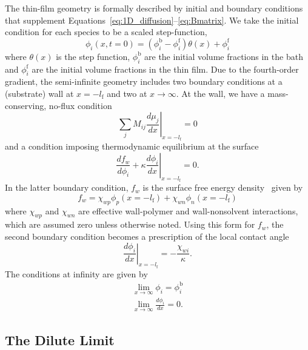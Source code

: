 \documentclass[journal=mamobx, layout=twocolumn]{achemso}
\newcommand{\txtf}{\mathrm{f}}
\newcommand{\txtb}{\mathrm{b}}
\begin{document}
The thin-film geometry is formally described by initial and boundary conditions that supplement Equations~\ref{eq:1D_diffusion}--\ref{eq:Bmatrix}.
We take the initial condition for each species to be a scaled step-function,
\begin{equation} \label{eq:ic}
\phi_{i}(x, t=0) = (\phi_{i}^{\txtb} - \phi_{i}^{\txtf}) \theta(x) + \phi_{i}^{\txtf}
\end{equation}
where $\theta(x)$ is the step function, $\phi_{i}^{\txtb}$ are the initial volume fractions in the bath and $\phi_{i}^{\txtf}$ are the initial volume fractions in the thin film.
Due to the fourth-order gradient, the semi-infinite geometry includes two boundary conditions at a (substrate) wall at $x = -l_{\txtf}$ and two at $x \rightarrow \infty$. 
At the wall, we have a mass-conserving, no-flux condition
\begin{equation}
\sum_{j} M_{ij} \left . \frac{d \mu_{j}}{d x} \right |_{x = -l_{\txtf}} = 0
\end{equation}
and a condition imposing thermodynamic equilibrium at the surface
\begin{equation}
\left . \frac{d f_{w}}{d \phi_{i}} + \kappa \frac{d \phi_{i}}{d x} \right |_{x=-l_{\txtf}} = 0 \textrm{.}
\end{equation}
In the latter boundary condition, $f_{w}$ is the surface free energy density~\cite{Schmidt1985,Hur2012} given by
\begin{equation}
f_w = \chi_{wp} \phi_{p}(x=-l_{\txtf}) + \chi_{wn} \phi_{n}(x=-l_{\txtf})
\end{equation}
where $\chi_{wp}$ and $\chi_{wn}$ are effective wall-polymer and wall-nonsolvent interactions, which are assumed zero unless otherwise noted.
Using this form for $f_{w}$, the second boundary condition becomes a prescription of the local contact angle
\begin{equation}
\left . \frac{d \phi_{i}}{d x} \right |_{x = -l_{\txtf}} = -\frac{\chi_{wi}}{\kappa} \textrm{.}
\end{equation}
The conditions at infinity are given by
\begin{gather}
\lim_{x\rightarrow\infty} \phi_{i} = \phi_{i}^{\txtb} \\
\lim_{x\rightarrow\infty} \frac{d \phi_{i}}{dx} = 0 \textrm{.}
\end{gather}

\subsection{The Dilute Limit}
\end{document}
